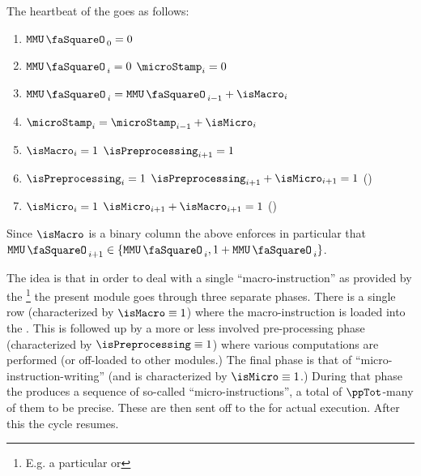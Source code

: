 The heartbeat of the \mmuMod{} goes as follows:
\begin{enumerate}
	\item $\mmuStamp_{0} = 0$
	\item \If $\mmuStamp_{i} = 0$ \Then $\microStamp_{i} = 0$
	\item $\mmuStamp_{i} = \mmuStamp_{i-1} + \isMacro_{i}$
	\item $\microStamp_{i} = \microStamp_{i-1} + \isMicro_{i}$
	\item \label{mmu: single macro instruction row}
		\If $\isMacro           _{i} = 1$ \Then $\isPreprocessing _{i + 1}                     = 1$
	\item \If $\isPreprocessing   _{i} = 1$ \Then $\isPreprocessing _{i + 1} + \isMicro_{i + 1}  = 1$ (\trash)
	\item \If $\isMicro           _{i} = 1$ \Then $\isMicro         _{i + 1} + \isMacro_{i + 1}  = 1$ (\trash)
\end{enumerate}
\saNote{} Since $\isMacro$ is a binary column the above enforces in particular that $\mmuStamp_{i + 1} \in \{ \mmuStamp_{i}, 1 + \mmuStamp_{i} \}$.

The idea is that in order to deal with a single ``macro-instruction'' as provided by the \hubMod{}\footnote{E.g. a particular  or } the present \mmuMod{} module goes through three separate phases.
There is a single row (characterized by $\isMacro \equiv 1$) where the macro-instruction is loaded into the \mmuMod{}.
This is followed up by a more or less involved pre-processing phase (characterized by $\isPreprocessing \equiv 1$) where various computations are performed (or off-loaded to other modules.)
The final phase is that of ``micro-instruction-writing'' (and is characterized by $\isMicro \equiv 1$.)
During that phase the \mmuMod{} produces a sequence of so-called ``micro-instructions'', a total of $\ppTot$-many of them to be precise.
These are then sent off to the \mmioMod{} for actual execution.
After this the cycle resumes.

